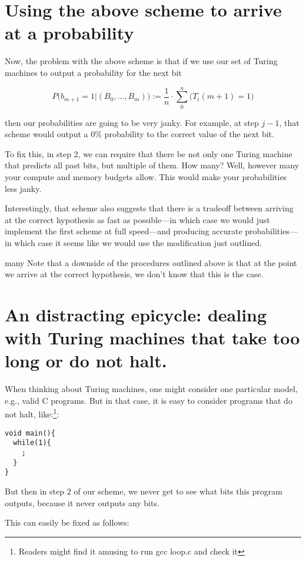 \documentclass[12pt,authoryear]{elsarticle}
\begin{document}
\section{Using the above scheme to arrive at a probability }

Now, the problem with the above scheme is that if we use our set of Turing machines to output a probability for the next bit

$$ P\Big(b_{m + 1} = 1 | (B_0, ..., B_m) \Big) := \frac{1}{n} \cdot \sum_0^n \Big(T_i(m+1) = 1\Big) $$

then our probabilities are going to be very janky. For example, at step $ j - 1 $, that scheme would output a 0\% probability to the correct value of the next bit.

To fix this, in step 2, we can require that there be not only one Turing machine that predicts all past bits, but multiple of them. How many? Well, however many your compute and memory budgets allow. This would make your probabilities less janky. 

Interestingly, that scheme also suggests that there is a tradeoff between arriving at the correct hypothesis as fast as possible—in which case we would just implement the first scheme at full speed—and producing accurate probabilities—in which case it seems like we would use the modification just outlined.

\sectionHow many
Note that a downside of the procedures outlined above is that at the point we arrive at the correct hypothesis, we don't know that this is the case.

\section{An distracting epicycle: dealing with Turing machines that take too long or do not halt.}

When thinking about Turing machines, one might consider one particular model, e.g., valid C programs. But in that case, it is easy to consider programs that do not halt, like:\footnote{Readers might find it amusing to run gcc loop.c and check it}:

\begin{verbatim}
void main(){
  while(1){
    ;
  }
}
\end{verbatim}

But then in step 2 of our scheme, we never get to see what bits this program outputs, because it never outputs any bits.

This can easily be fixed as follows:
\end{document}
